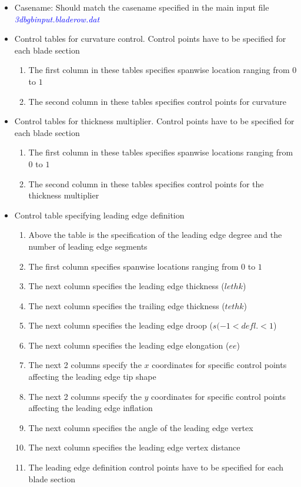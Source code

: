 \documentclass[8pt]{article}
\begin{document}
\noindent
\begin{itemize}[leftmargin=*]
    \item Casename: Should match the casename specified in the main input file \textit{\textcolor{blue}{3dbgbinput.bladerow.dat}}
    \item Control tables for curvature control. Control points have to be specified for each blade section
    \begin{enumerate}[label=\alph*]
        \item The first column in these tables specifies spanwise location ranging from $0$ to $1$
        \item The second column in these tables specifies control points for curvature
    \end{enumerate}
    \item Control tables for thickness multiplier. Control points have to be specified for each blade section
    \begin{enumerate}[label=\alph*]
        \item The first column in these tables specifies spanwise locations ranging from $0$ to $1$
        \item The second column in these tables specifies control points for the thickness multiplier
    \end{enumerate} 
    \item Control table specifying leading edge definition
    \begin{enumerate}[label=\alph*]
        \item Above the table is the specification of the leading edge degree and the number of leading edge segments
        \item The first column specifies spanwise locations ranging from $0$ to $1$
        \item The next column specifies the leading edge thickness ($lethk$)
        \item The next column specifies the trailing edge thickness ($tethk$)
        \item The next column specifies the leading edge droop ($s(-1<defl.<1$)
        \item The next column specifies the leading edge elongation ($ee$)
        \item The next 2 columns specify the $x$ coordinates for specific control points affecting the leading edge tip shape
        \item The next 2 columns specify the $y$ coordinates for specific control points affecting the leading edge inflation
        \item The next column specifies the angle of the leading edge vertex
        \item The next column specifies the leading edge vertex distance
        \item The leading edge definition control points have to be specified for each blade section
    \end{enumerate}
\end{itemize}
\end{document}
